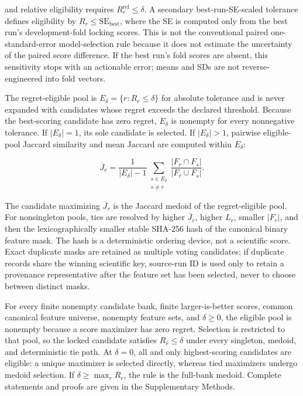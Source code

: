 and relative eligibility requires \(R_r^{\mathrm{rel}}\le\delta\). A secondary best-run-SE-scaled tolerance defines eligibility by \(R_r\le\mathrm{SE}_{\mathrm{best}}\), where the SE is computed only from the best run's development-fold locking scores. This is not the conventional paired one-standard-error model-selection rule because it does not estimate the uncertainty of the paired score difference. If the best run's fold scores are absent, this sensitivity stops with an actionable error; means and SDs are not reverse-engineered into fold vectors.

The regret-eligible pool is \(E_\delta=\{r:R_r\leq\delta\}\) for absolute tolerance and is never expanded with candidates whose regret exceeds the declared threshold. Because the best-scoring candidate has zero regret, \(E_\delta\) is nonempty for every nonnegative tolerance. If \(|E_\delta|=1\), its sole candidate is selected. If \(|E_\delta|>1\), pairwise eligible-pool Jaccard similarity and mean Jaccard are computed within \(E_\delta\):

\begin{equation}
\overline J_r=\frac{1}{|E_\delta|-1}\sum_{\substack{s\in E_\delta\\s\ne r}}
\frac{|F_r\cap F_s|}{|F_r\cup F_s|}.
\label{eq:eligible-medoid}
\end{equation}

The candidate maximizing \(\overline J_r\) is the Jaccard medoid of the regret-eligible pool. For nonsingleton pools, ties are resolved by higher \(\overline J_r\), higher \(L_r\), smaller \(|F_r|\), and then the lexicographically smaller stable SHA-256 hash of the canonical binary feature mask. The hash is a deterministic ordering device, not a scientific score. Exact duplicate masks are retained as multiple voting candidates; if duplicate records share the winning scientific key, source-run ID is used only to retain a provenance representative after the feature set has been selected, never to choose between distinct masks.

For every finite nonempty candidate bank, finite larger-is-better scores, common canonical feature universe, nonempty feature sets, and \(\delta\geq0\), the eligible pool is nonempty because a score maximizer has zero regret. Selection is restricted to that pool, so the locked candidate satisfies \(R_{\widehat r}\leq\delta\) under every singleton, medoid, and deterministic tie path. At \(\delta=0\), all and only highest-scoring candidates are eligible: a unique maximizer is selected directly, whereas tied maximizers undergo medoid selection. If \(\delta\geq\max_rR_r\), the rule is the full-bank medoid. Complete statements and proofs are given in the Supplementary Methods.


